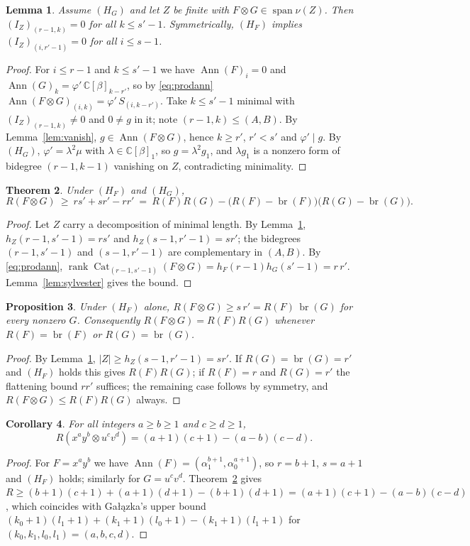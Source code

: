 \documentclass[11pt]{amsart}
\newtheorem{theorem}{Theorem}[section]
\newtheorem{lemma}[theorem]{Lemma}
\newtheorem{proposition}[theorem]{Proposition}
\newtheorem{corollary}[theorem]{Corollary}
\theoremstyle{remark}
\newcommand{\C}{\mathbb{C}}
\DeclareMathOperator{\Ann}{Ann}
\DeclareMathOperator{\Cat}{Cat}
\DeclareMathOperator{\rank}{rank}
\DeclareMathOperator{\br}{br}
\begin{document}
\begin{lemma}\label{lem:peelgeneral}
Assume $(H_G)$ and let $Z$ be finite with $F\otimes G\in\operatorname{span}\nu(Z)$. Then $(I_Z)_{(r-1,k)}=0$ for all $k\le s'-1$. Symmetrically, $(H_F)$ implies $(I_Z)_{(i,r'-1)}=0$ for all $i\le s-1$.
\end{lemma}
\begin{proof}
For $i\le r-1$ and $k\le s'-1$ we have $\Ann(F)_i=0$ and $\Ann(G)_k=\varphi'\,\C[\beta]_{k-r'}$, so by \eqref{eq:prodann} $\Ann(F\otimes G)_{(i,k)}=\varphi'\,S_{(i,k-r')}$. Take $k\le s'-1$ minimal with $(I_Z)_{(r-1,k)}\ne0$ and $0\ne g$ in it; note $(r-1,k)\le(A,B)$. By Lemma~\ref{lem:vanish}, $g\in\Ann(F\otimes G)$, hence $k\ge r'$, $r'<s'$ and $\varphi'\mid g$. By $(H_G)$, $\varphi'=\lambda^2\mu$ with $\lambda\in\C[\beta]_1$, so $g=\lambda^2g_1$, and $\lambda g_1$ is a nonzero form of bidegree $(r-1,k-1)$ vanishing on $Z$, contradicting minimality.
\end{proof}

\begin{theorem}\label{thm:B}
Under $(H_F)$ and $(H_G)$,
\[
R(F\otimes G)\ \ge\ rs'+sr'-rr'\ =\ R(F)R(G)-\bigl(R(F)-\br(F)\bigr)\bigl(R(G)-\br(G)\bigr).
\]
\end{theorem}
\begin{proof}
Let $Z$ carry a decomposition of minimal length. By Lemma~\ref{lem:peelgeneral}, $h_Z(r-1,s'-1)=rs'$ and $h_Z(s-1,r'-1)=sr'$; the bidegrees $(r-1,s'-1)$ and $(s-1,r'-1)$ are complementary in $(A,B)$. By \eqref{eq:prodann}, $\rank\Cat_{(r-1,s'-1)}(F\otimes G)=h_F(r-1)h_G(s'-1)=r\,r'$. Lemma~\ref{lem:sylvester} gives the bound.
\end{proof}

\begin{proposition}\label{prop:C}
Under $(H_F)$ alone, $R(F\otimes G)\ge s\,r'=R(F)\,\br(G)$ for every nonzero $G$. Consequently $R(F\otimes G)=R(F)R(G)$ whenever $R(F)=\br(F)$ or $R(G)=\br(G)$.
\end{proposition}
\begin{proof}
By Lemma~\ref{lem:peelgeneral}, $|Z|\ge h_Z(s-1,r'-1)=sr'$. If $R(G)=\br(G)=r'$ and $(H_F)$ holds this gives $R(F)R(G)$; if $R(F)=r$ and $R(G)=r'$ the flattening bound $rr'$ suffices; the remaining case follows by symmetry, and $R(F\otimes G)\le R(F)R(G)$ always.
\end{proof}

\begin{corollary}\label{cor:monomial}
For all integers $a\ge b\ge1$ and $c\ge d\ge1$,
\[
R(x^ay^b\otimes u^cv^d)=(a+1)(c+1)-(a-b)(c-d).
\]
\end{corollary}
\begin{proof}
For $F=x^ay^b$ we have $\Ann(F)=(\alpha_1^{b+1},\alpha_0^{a+1})$, so $r=b+1$, $s=a+1$ and $(H_F)$ holds; similarly for $G=u^cv^d$. Theorem~\ref{thm:B} gives $R\ge(b+1)(c+1)+(a+1)(d+1)-(b+1)(d+1)=(a+1)(c+1)-(a-b)(c-d)$, which coincides with Ga{\l}\k{a}zka's upper bound $(k_0+1)(l_1+1)+(k_1+1)(l_0+1)-(k_1+1)(l_1+1)$ \cite[Thm.~1.5(i)]{Gal} for $(k_0,k_1,l_0,l_1)=(a,b,c,d)$.
\end{proof}
\end{document}
